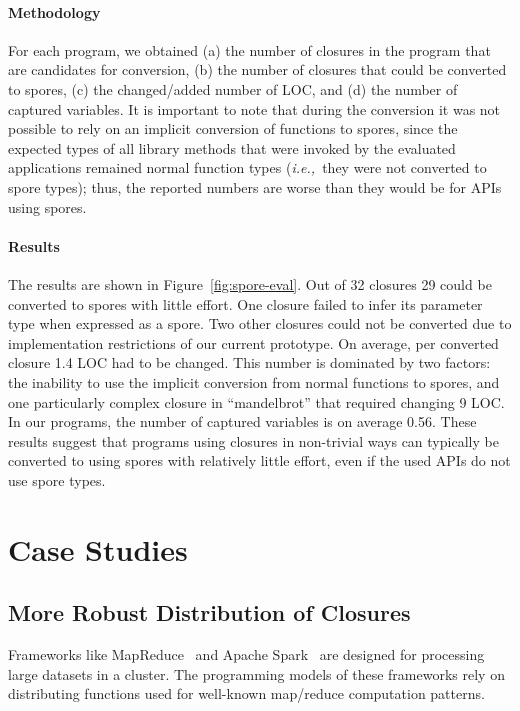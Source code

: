 \documentclass{llncs}
\newcommand{\ie}{{\em i.e.,~}}
\begin{document}
\paragraph{\textbf{Methodology}} For each program, we obtained (a) the number of closures in the program that are candidates for conversion, (b) the number of closures that could be converted to spores, (c) the changed/added number of LOC, and (d) the number of captured variables. It is important to note that during the conversion it was not possible to rely on an implicit conversion of functions to spores, since the expected types of all library methods that were invoked by the evaluated applications remained normal function types (\ie they were not converted to spore types); thus, the reported numbers are worse than they would be for APIs using spores.

\paragraph{\textbf{Results}} The results are shown in Figure~\ref{fig:spore-eval}. Out of 32 closures 29 could be converted to spores with little effort. One closure failed to infer its parameter type when expressed as a spore. Two other closures could not be converted due to implementation restrictions of our current prototype. On average, per converted closure 1.4 LOC had to be changed. This number is dominated by two factors: the inability to use the implicit conversion from normal functions to spores, and one particularly complex closure in ``mandelbrot'' that required changing 9 LOC. In our programs, the number of captured variables is on average 0.56. These results suggest that programs using closures in non-trivial ways can typically be converted to using spores with relatively little effort, even if the used APIs do not use spore types.


\section{Case Studies}
\label{sec:case-studies}

\subsection{More Robust Distribution of Closures}

Frameworks like MapReduce~\cite{MapReduce} and Apache Spark~\cite{Spark} are designed for processing large datasets in a cluster. The programming models of these frameworks rely on distributing functions used for well-known map/reduce computation patterns.
\end{document}
